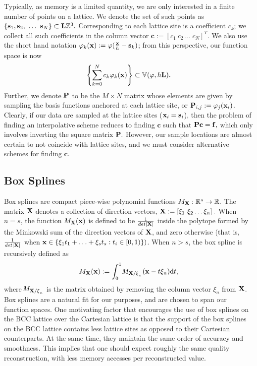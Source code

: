 Typically, as memory is a limited quantity, we are only interested in a finite number of points on a lattice. We denote the set of such points as $\{\mathbf{s}_1,\mathbf{s}_2,\ \hdots  \ \mathbf{s}_N\} \subset \mathbf{L}\intn^3.$ Corresponding to each lattice site is a coefficient $c_k$; we collect all such coefficients in the column vector $\mathbf{c}:=\left[c_1 \ c_2 \ \hdots \ c_N \right]^T.$ We also use the short hand notation $\varphi_k(\mathbf{x}) := \varphi(\frac{\mathbf{x}}{h}-\mathbf{s}_k)$; from this perspective, our function space is now {\small 
\begin{equation}
	\left\{ \displaystyle\sum_{k=0}^N c_k \varphi_k(\mathbf{x}) \right\} \subset \mathbb{V}(\varphi, h\mathbf{L}).
\end{equation}}
Further, we denote $\mathbf{\mathbf{P}}$ to be the $M \times N$ matrix whose elements are given by sampling the basis functions anchored at each lattice site, or $\mathbf{P}_{i,j} := \varphi_j(\mathbf{x}_i)$. Clearly, if our data are sampled at the lattice sites ($\mathbf{x}_i = \mathbf{s}_i$), then the problem of finding an interpolative scheme reduces to finding $\mathbf{c}$ such that $\mathbf{\mathbf{P} c=f},$ which only involves inverting the square matrix $\mathbf{\mathbf{P}}.$ However, our sample locations are almost certain to not coincide with lattice sites, and we must consider alternative schemes for finding $\mathbf{c}.$

\subsection{Box Splines}
\label{sec:box_review}
Box splines are compact piece-wise polynomial functions $ M_\mathbf{\mathbf{X}} : \mathbb{R}^s \to \mathbb{R}.$ The matrix $\mathbf{\mathbf{X}}$ denotes a collection of direction vectors, $\mathbf{\mathbf{X}} := \left[ \xi_1 \ \xi_2 \hdots \xi_n\right].$ When $n=s$, the function $M_\mathbf{\mathbf{X}}(\mathbf{x})$ is defined to be $\frac{1}{det|\mathbf{\mathbf{X}}|}$ inside the polytope formed by the Minkowski sum of the direction vectors of $\mathbf{\mathbf{X}}$, and zero otherwise (that is, $\frac{1}{det|\mathbf{\mathbf{X}}|}$ when $\mathbf{x} \in \{ \mathbf{\xi}_1 t_1 + \hdots + \mathbf{\xi}_s t_s  : t_i\in [0,1) \})$. When $n > s$, the box spline is recursively defined as {\small 
\begin{equation} \label{eq:box_def}
	M_{\mathbf{\Xii}}(\vx) := \int_0^1{\!M_{\mathbf{\Xii/\xi}_n}(\vx - t\mathbf{\xi}_n)} \mathrm{d}t,
\end{equation}}
where $\!M_{\mathbf{\mathbf{X}/\xi}_n}$ is the matrix obtained by removing the column vector $\xi_n$ from $\mathbf{\mathbf{X}}$. Box splines are a natural fit for our purposes, and are chosen to span our function spaces. One motivating factor that encourages the use of box splines on the BCC lattice over the Cartesian lattice is that the support of the box splines on the BCC lattice contains less lattice sites as opposed to their Cartesian counterparts. At the same time, they maintain the same order of accuracy and smoothness. This implies that one should expect roughly the same quality reconstruction, with less memory accesses per reconstructed value.

